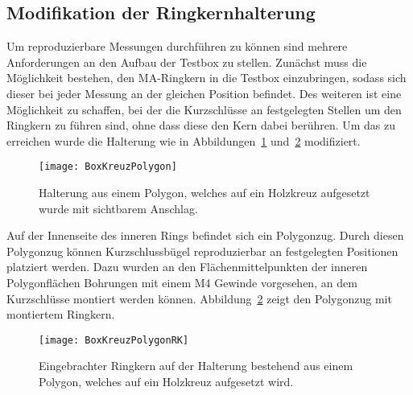 \newpage


\subsection{Modifikation der Ringkernhalterung}
Um reproduzierbare Messungen durchf\"uhren zu k\"onnen sind mehrere Anforderungen an den Aufbau der Testbox zu stellen. Zun\"achst muss die M\"oglichkeit bestehen, den MA-Ringkern in die Testbox einzubringen, sodass sich dieser bei jeder Messung an der gleichen Position befindet. Des weiteren ist eine M\"oglichkeit zu schaffen, bei der die Kurzschl\"usse an festgelegten  Stellen um den Ringkern zu f\"uhren sind, ohne dass diese den Kern dabei ber\"uhren. Um das zu erreichen wurde die Halterung wie in Abbildungen~\ref{fig:BoxKreuzPolygon} und~\ref{fig:BoxKreuzPolygonRK} modifiziert.



\begin{figure}[htb]
	\centering
	\texttt{[image: BoxKreuzPolygon]}
	\caption{Halterung aus einem Polygon, welches auf ein Holzkreuz aufgesetzt wurde mit sichtbarem Anschlag.}
	\label{fig:BoxKreuzPolygon}
\end{figure}

Auf der Innenseite des inneren Rings befindet sich ein Polygonzug. Durch diesen Polygonzug k\"onnen Kurzschlussb\"ugel reproduzierbar an festgelegten Positionen platziert werden. Dazu wurden an den Fl\"achenmittelpunkten der inneren Polygonfl\"achen Bohrungen mit einem M4 Gewinde vorgesehen, an dem Kurzschl\"usse montiert werden k\"onnen. Abbildung~\ref{fig:BoxKreuzPolygonRK} zeigt den Polygonzug mit montiertem Ringkern.

\begin{figure}[htb]
	\centering
	\texttt{[image: BoxKreuzPolygonRK]}
	\caption{Eingebrachter Ringkern auf der Halterung bestehend aus einem Polygon, welches auf ein Holzkreuz aufgesetzt wird.}
	\label{fig:BoxKreuzPolygonRK}
\end{figure}


